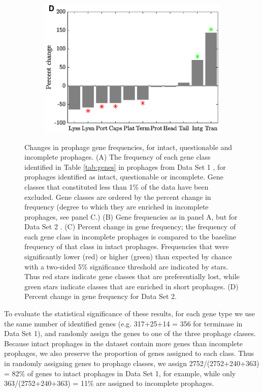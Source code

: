 \begin{figure}
\begin{subfigure}[t]{0.50\textwidth}
     \end{subfigure}\hfill
     \begin{subfigure}[t]{0.50\textwidth} 
    \includegraphics[scale=0.50]{aclame2}
     \end{subfigure}\hfill
    \caption[Changes in prophage gene frequencies, for intact, questionable and incomplete prophages.]{Changes in prophage gene frequencies, for intact, questionable and incomplete prophages.  (A) The frequency of each gene class identified in Table \ref{tab:genes} in prophages from Data Set 1 \cite{bobay_pervasive_2014}, for prophages identified as intact, questionable or incomplete.  Gene classes that constituted less than 1\% of the data have been excluded. Gene classes are ordered by the percent change in frequency (degree to which they are enriched in incomplete prophages, see panel C.) (B) Gene frequencies as in panel A, but for Data Set 2 \cite{leplae_aclame:_2010}.  (C) Percent change in gene frequency; the frequency of each gene class in incomplete prophages is compared to the baseline frequency of that class in intact prophages.  Frequencies that were significantly lower (red) or higher (green) than expected by chance with a two-sided 5\% significance threshold are indicated by stars.  Thus red stars indicate gene classes that are preferentially lost, while green stars indicate classes that are enriched in short prophages.  (D) Percent change in gene frequency for Data Set 2.} 
\label{fig:data4}
\end{figure}

To evaluate the statistical significance of these results, for each gene type we use the same number of identified genes (e.g. 317+25+14 = 356 for terminase in Data Set 1), and randomly assign the genes to one of the three prophage classes.  Because intact prophages in the dataset contain more genes than incomplete prophages, we also preserve the proportion of genes assigned to each class.  Thus in randomly assigning genes to prophage classes, we assign 2752/(2752+240+363) = 82\% of genes to intact prophages in Data Set 1, for example, while only
363/(2752+240+363) = 11\% are assigned to
incomplete prophages.

